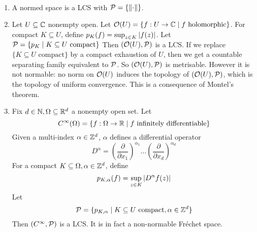 \documentclass{article}
\begin{document}
\begin{egs}~

  \begin{enumerate}
    \item A normed space is a LCS with $\mathcal P = \{\left\lVert \cdot\right\rVert\}$.
    \item Let $U \subseteq \mathbb C$ nonempty open. Let $\mathcal O(U) = \{f : U \rightarrow \mathbb C \mid f \text{ holomorphic}\}$. For compact $K \subseteq U$, define $p_K(f) = \sup_{z \in K} \left\lvert f(z)\right\rvert$. Let
    $\mathcal P = \{p_K \mid K \subseteq U \text{ compact}\}$
    Then $(\mathcal O(U), \mathcal P)$ is a LCS. If we replace $\{K \subseteq U \text{ compact}\}$ by a compact exhaustion of $U$, then we get a countable separating family equivalent to $\mathcal P$. So $(\mathcal O(U), \mathcal P)$ is metrisable. However it is not normable: no norm on $\mathcal O(U)$ induces the topology of $(\mathcal O(U), \mathcal P)$, which is the topology of uniform convergence. This is a consequence of Montel's theorem.
    \item Fix $d \in \mathbb N, \Omega \subseteq \mathbb R^d$ a nonempty open set. Let
    $$C^\infty(\Omega) = \{f : \Omega \rightarrow \mathbb R \mid f \text{ infinitely differentiable}\}$$
    Given a multi-index $\alpha \in \mathbb Z^d$, $\alpha$ defines a differential operator
    $$D^\alpha = \left(\frac\partial{\partial x_1}\right)^{\alpha_1} \dots
    \left(\frac\partial{\partial x_d}\right)^{\alpha_d}$$
    For a compact $K \subseteq \Omega, \alpha \in \mathbb Z^d$, define
    $$p_{K, \alpha}(f) = \sup_{z \in K}\left\lvert D^\alpha f(z)\right\rvert$$
    Let
    $$\mathcal P = \{p_{K, \alpha} \mid K \subseteq U \text{ compact}, \alpha \in \mathbb Z^d\}$$
    Then $(C^\infty, \mathcal P)$ is a LCS. It is in fact a non-normable Fréchet space.
  \end{enumerate}
\end{egs}
\end{document}
